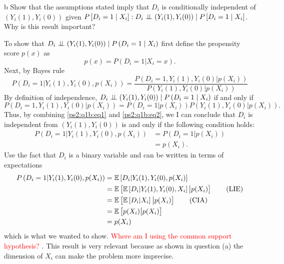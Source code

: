 \documentclass{article}
\begin{document}
\begin{problem}{b}
Show that the assumptions stated imply that $D_{i}$ is conditionally independent of $\left(Y_{i}(1), Y_{i}(0)\right)$ given $P\left[D_{i}=1 \mid X_{i}\right]: D_{i} \perp\!\!\!\perp\left(Y_{i}(1), Y_{i}(0)\right) \mid P\left[D_{i}=1 \mid X_{i}\right]$. Why is this result important?
\end{problem}
\begin{solution}
To show that $D_{i} \perp\!\!\!\perp\left(Y_{i}(1), Y_{i}(0)\right) \mid P\left(D_{i}=1 \mid X_{i}\right)$ first define the propensity score $p(x)$ as 
\begin{equation*}
    p(x) = P(D_i=1\vert X_i=x).
\end{equation*}
Next, by Bayes rule
\begin{equation}\label{ps2:q1b:eq1}
    P\left(D_i=1\vert Y_i(1),Y_i(0),p(X_i)\right) = \frac{P\left(D_i=1, Y_i(1),Y_i(0)\vert p(X_i)\right)}{P\left(Y_i(1),Y_i(0)\vert p(X_i)\right)}
\end{equation}
By definition of independence, $D_{i} \perp\!\!\!\perp\left(Y_{i}(1), Y_{i}(0)\right) \mid P\left(D_{i}=1 \mid X_{i}\right)$ if and only if 
\begin{equation}\label{ps2:q1b:eq2}
   P\left(D_i=1, Y_i(1),Y_i(0)\vert p(X_i)\right) =P\left(D_i=1\vert p(X_i)\right)P\left( Y_i(1),Y_i(0)\vert p(X_i)\right).
\end{equation}
Thus, by combining \eqref{ps2:q1b:eq1} and \eqref{ps2:q1b:eq2}, we I can conclude that $D_i$ is independent from $(Y_i(1),Y_i(0))$ is and only if the following condition holds:  
\begin{align*}
    P\left(D_i=1\vert Y_i(1),Y_i(0),p(X_i)\right) &= P\left(D_i=1\vert p(X_i)\right) \\ 
    &= p(X_i).
\end{align*}
Use the fact that $D_i$ is a binary variable and can be written in terms of expectations
\begin{align*}
    P\left(D_i=1\vert Y_i(1),Y_i(0),p(X_i)\right) &= \mathbb{E}\left[D_i\vert Y_i(1),Y_i(0),p(X_i) \right] \\ 
    &= \mathbb{E}\left[\mathbb{E}\left[D_i\vert Y_i(1),Y_i(0),X_i\right]\big\vert p(X_i) \right] \tag{LIE} \\ 
    &= \mathbb{E}\left[\mathbb{E}\left[D_i\vert X_i\right]\big\vert p(X_i) \right] \tag{CIA} \\ 
    &= \mathbb{E}\left[p(X_i) \big\vert p(X_i) \right] \\ 
    &= p(X_i)
\end{align*}
which is what we wanted to show. \textcolor{red}{Where am I using the common support hypothesis? }. This result is very relevant because as shown in question (a) the dimension of $X_i$ can make the problem more imprecise. 
\end{solution}
\end{document}
